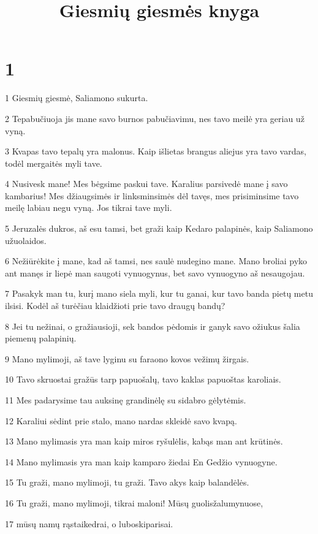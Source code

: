 

\title{Giesmių giesmės knyga}


\chapter{1}


\par 1 Giesmių giesmė, Saliamono sukurta. 
\par 2 Tepabučiuoja jis mane savo burnos pabučiavimu, nes tavo meilė yra geriau už vyną. 
\par 3 Kvapas tavo tepalų yra malonus. Kaip išlietas brangus aliejus yra tavo vardas, todėl mergaitės myli tave. 
\par 4 Nusivesk mane! Mes bėgsime paskui tave. Karalius parsivedė mane į savo kambarius! Mes džiaugsimės ir linksminsimės dėl tavęs, mes prisiminsime tavo meilę labiau negu vyną. Jos tikrai tave myli. 
\par 5 Jeruzalės dukros, aš esu tamsi, bet graži kaip Kedaro palapinės, kaip Saliamono užuolaidos. 
\par 6 Nežiūrėkite į mane, kad aš tamsi, nes saulė nudegino mane. Mano broliai pyko ant manęs ir liepė man saugoti vynuogynus, bet savo vynuogyno aš nesaugojau. 
\par 7 Pasakyk man tu, kurį mano siela myli, kur tu ganai, kur tavo banda pietų metu ilsisi. Kodėl aš turėčiau klaidžioti prie tavo draugų bandų? 
\par 8 Jei tu nežinai, o gražiausioji, sek bandos pėdomis ir ganyk savo ožiukus šalia piemenų palapinių. 
\par 9 Mano mylimoji, aš tave lyginu su faraono kovos vežimų žirgais. 
\par 10 Tavo skruostai gražūs tarp papuošalų, tavo kaklas papuoštas karoliais. 
\par 11 Mes padarysime tau auksinę grandinėlę su sidabro gėlytėmis. 
\par 12 Karaliui sėdint prie stalo, mano nardas skleidė savo kvapą. 
\par 13 Mano mylimasis yra man kaip miros ryšulėlis, kabąs man ant krūtinės. 
\par 14 Mano mylimasis yra man kaip kamparo žiedai En Gedžio vynuogyne. 
\par 15 Tu graži, mano mylimoji, tu graži. Tavo akys kaip balandėlės. 
\par 16 Tu graži, mano mylimoji, tikrai maloni! Mūsų guolis­žalumynuose, 
\par 17 mūsų namų rąstai­kedrai, o lubos­kiparisai.


